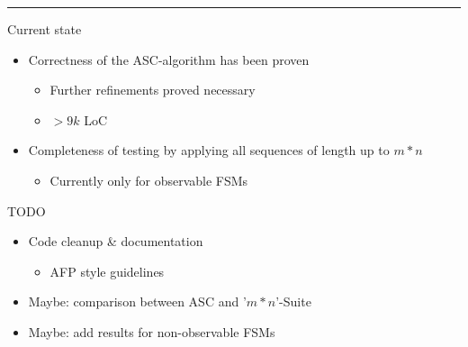 \documentclass[aspectratio=169]{beamer}
\begin{document}
\begin{frame}
\hrule{}

\centering

\end{frame}





\begin{frame}{Current state}
\begin{itemize}
	\item Correctness of the ASC-algorithm has been proven
	\begin{itemize}
		\item Further refinements proved necessary
		\item $>9k$ LoC
	\end{itemize}
  
    \item Completeness of testing by applying all sequences of length up to $m*n$ 
    \begin{itemize}
    	\item Currently only for observable FSMs
    \end{itemize}
\end{itemize}
\end{frame}

\begin{frame}{TODO}
\begin{itemize}
	\item Code cleanup \& documentation
	\begin{itemize}
		\item AFP style guidelines
	\end{itemize}
	\item Maybe: comparison between ASC and '$m*n$'-Suite
	\item Maybe: add results for non-observable FSMs
\end{itemize}
\end{frame}
\end{document}
